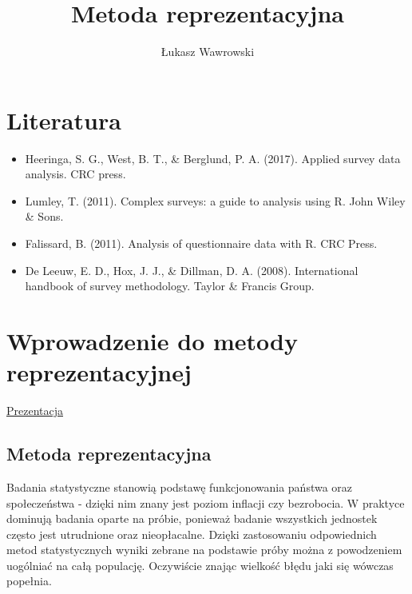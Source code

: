 \documentclass[
]{book}
\title{Metoda reprezentacyjna}
\author{Łukasz Wawrowski}
\date{}
\providecommand{\tightlist}{%
  \setlength{\itemsep}{0pt}\setlength{\parskip}{0pt}}
\begin{document}
\maketitle

{
\hypersetup{linkcolor=}
\setcounter{tocdepth}{1}
\tableofcontents
}
\listoftables
\listoffigures
\hypertarget{literatura}{%
\chapter*{Literatura}\label{literatura}}

\begin{itemize}
\tightlist
\item
  Heeringa, S. G., West, B. T., \& Berglund, P. A. (2017). Applied survey data analysis. CRC press.
\item
  Lumley, T. (2011). Complex surveys: a guide to analysis using R. John Wiley \& Sons.
\item
  Falissard, B. (2011). Analysis of questionnaire data with R. CRC Press.
\item
  De Leeuw, E. D., Hox, J. J., \& Dillman, D. A. (2008). International handbook of survey methodology. Taylor \& Francis Group.
\end{itemize}

\hypertarget{wprowadzenie-do-metody-reprezentacyjnej}{%
\chapter{Wprowadzenie do metody reprezentacyjnej}\label{wprowadzenie-do-metody-reprezentacyjnej}}

\href{https://docs.google.com/presentation/d/1U-vMmSwtyOHihqkImD5gSmuTuksHvnUhGHXcMESNOS8/edit?usp=sharing}{Prezentacja}

\hypertarget{metoda-reprezentacyjna}{%
\section{Metoda reprezentacyjna}\label{metoda-reprezentacyjna}}

Badania statystyczne stanowią podstawę funkcjonowania państwa oraz społeczeństwa - dzięki nim znany jest poziom inflacji czy bezrobocia. W praktyce dominują badania oparte na próbie, ponieważ badanie wszystkich jednostek często jest utrudnione oraz nieopłacalne. Dzięki zastosowaniu odpowiednich metod statystycznych wyniki zebrane na podstawie próby można z powodzeniem uogólniać na całą populację. Oczywiście znając wielkość błędu jaki się wówczas popełnia.
\end{document}
